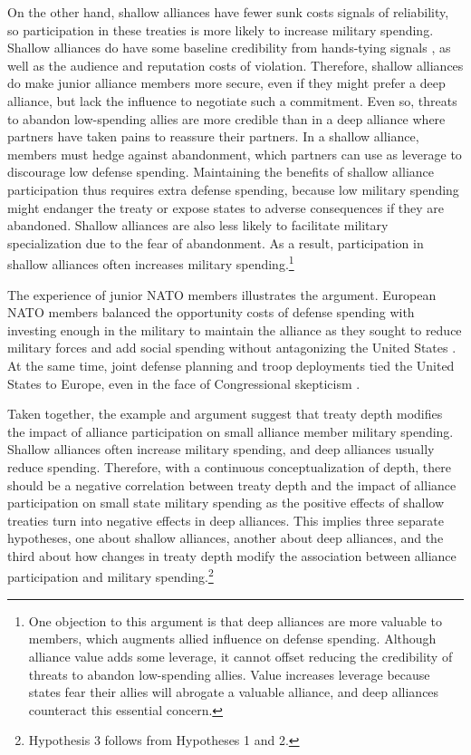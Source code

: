 \documentclass[12pt]{article}
\begin{document}
On the other hand, shallow alliances have fewer sunk costs signals of reliability, so participation in these treaties is more likely to increase military spending. 
Shallow alliances do have some baseline credibility from hands-tying signals \citep{Fearon1997}, as well as the audience \citep{Morrow2000} and reputation \citep{Gibler2008, Crescenzietal2012} costs of violation.
Therefore, shallow alliances do make junior alliance members more secure, even if they might prefer a deep alliance, but lack the influence to negotiate such a commitment. 
Even so, threats to abandon low-spending allies are more credible than in a deep alliance where partners have taken pains to reassure their partners.  
In a shallow alliance, members must hedge against abandonment, which partners can use as leverage to discourage low defense spending. 
Maintaining the benefits of shallow alliance participation thus requires extra defense spending, because low military spending might endanger the treaty or expose states to adverse consequences if they are abandoned. 
Shallow alliances are also less likely to facilitate military specialization due to the fear of abandonment. 
As a result, participation in shallow alliances often increases military spending.\footnote{
One objection to this argument is that deep alliances are more valuable to members, which augments allied influence on defense spending. 
Although alliance value adds some leverage, it cannot offset reducing the credibility of threats to abandon low-spending allies.
Value increases leverage because states fear their allies will abrogate a valuable alliance, and deep alliances counteract this essential concern. 
}


The experience of junior NATO members illustrates the argument. 
European NATO members balanced the opportunity costs of defense spending with investing enough in the military to maintain the alliance as they sought to reduce military forces and add social spending without antagonizing the United States \citep[pg. 182-3]{Sayle2019}.
At the same time, joint defense planning and troop deployments tied the United States to Europe, even in the face of Congressional skepticism \citep[pg 175]{Sayle2019}. 
 
 
Taken together, the example and argument suggest that treaty depth modifies the impact of alliance participation on small alliance member military spending. 
Shallow alliances often increase military spending, and deep alliances usually reduce spending.  
Therefore, with a continuous conceptualization of depth, there should be a negative correlation between treaty depth and the impact of alliance participation on small state military spending as the positive effects of shallow treaties turn into negative effects in deep alliances. 
This implies three separate hypotheses, one about shallow alliances, another about deep alliances, and the third about how changes in treaty depth modify the association between alliance participation and military spending.\footnote{Hypothesis 3 follows from Hypotheses 1 and 2.}
 
\end{document}
